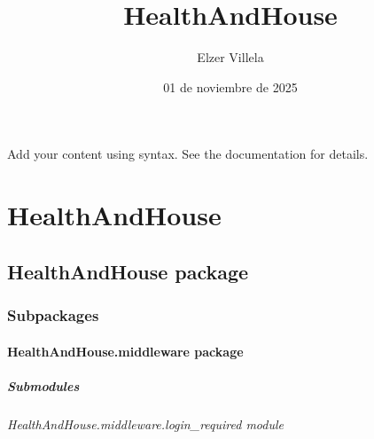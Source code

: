 \documentclass[a4paper,11pt,spanish]{sphinxmanual}
\title{HealthAndHouse}
\date{01 de noviembre de 2025}
\author{Elzer Villela}
\begin{document}
\pagestyle{empty}
\sphinxmaketitle
\pagestyle{plain}
\sphinxtableofcontents
\pagestyle{normal}
\label{\detokenize{index::doc}}


\sphinxAtStartPar
Add your content using  syntax. See the
documentation for details.

\sphinxstepscope


\chapter{HealthAndHouse}
\label{\detokenize{api/HealthAndHouse/modules:healthandhouse}}\label{\detokenize{api/HealthAndHouse/modules::doc}}
\sphinxstepscope


\section{HealthAndHouse package}
\label{\detokenize{api/HealthAndHouse/HealthAndHouse:healthandhouse-package}}\label{\detokenize{api/HealthAndHouse/HealthAndHouse::doc}}

\subsection{Subpackages}
\label{\detokenize{api/HealthAndHouse/HealthAndHouse:subpackages}}
\sphinxstepscope


\subsubsection{HealthAndHouse.middleware package}
\label{\detokenize{api/HealthAndHouse/HealthAndHouse.middleware:healthandhouse-middleware-package}}\label{\detokenize{api/HealthAndHouse/HealthAndHouse.middleware::doc}}

\paragraph{Submodules}
\label{\detokenize{api/HealthAndHouse/HealthAndHouse.middleware:submodules}}
\sphinxstepscope


\subparagraph{HealthAndHouse.middleware.login\_required module}
\label{\detokenize{api/HealthAndHouse/HealthAndHouse.middleware.login_required:module-HealthAndHouse.middleware.login_required}}\label{\detokenize{api/HealthAndHouse/HealthAndHouse.middleware.login_required:healthandhouse-middleware-login-required-module}}\label{\detokenize{api/HealthAndHouse/HealthAndHouse.middleware.login_required::doc}}
\end{document}
